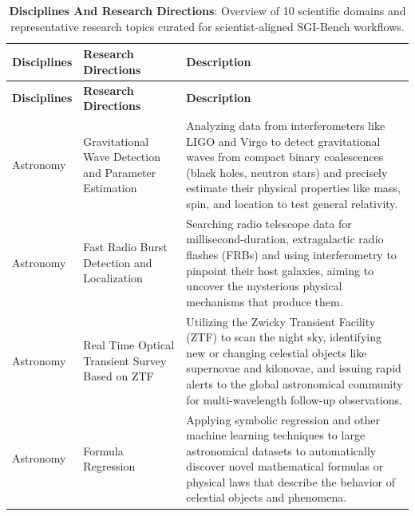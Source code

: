 

\begin{longtable}{p{2cm}p{6cm}p{7cm}}

\caption{\textbf{Disciplines And Research Directions}: Overview of 10 scientific domains and representative research topics curated for scientist-aligned SGI-Bench workflows.}
\label{tab:Disciplines and Research Directions Overview}\\

\hline
\textbf{Disciplines} & \textbf{Research Directions} & \textbf{Description} \\
\hline
\endfirsthead
\hline
\textbf{Disciplines} & \textbf{Research Directions} & \textbf{Description} \\
\hline
\endhead

\rowcolor{AstronomyColor} Astronomy & Gravitational Wave Detection and Parameter Estimation & Analyzing data from interferometers like LIGO and Virgo to detect gravitational waves from compact binary coalescences (black holes, neutron stars) and precisely estimate their physical properties like mass, spin, and location to test general relativity. \\
\rowcolor{AstronomyColor} Astronomy & Fast Radio Burst Detection and Localization & Searching radio telescope data for millisecond-duration, extragalactic radio flashes (FRBs) and using interferometry to pinpoint their host galaxies, aiming to uncover the mysterious physical mechanisms that produce them. \\
\rowcolor{AstronomyColor} Astronomy & Real Time Optical Transient Survey Based on ZTF & Utilizing the Zwicky Transient Facility (ZTF) to scan the night sky, identifying new or changing celestial objects like supernovae and kilonovae, and issuing rapid alerts to the global astronomical community for multi-wavelength follow-up observations. \\
\rowcolor{AstronomyColor} Astronomy & Formula Regression & Applying symbolic regression and other machine learning techniques to large astronomical datasets to automatically discover novel mathematical formulas or physical laws that describe the behavior of celestial objects and phenomena. \\


\end{longtable}
